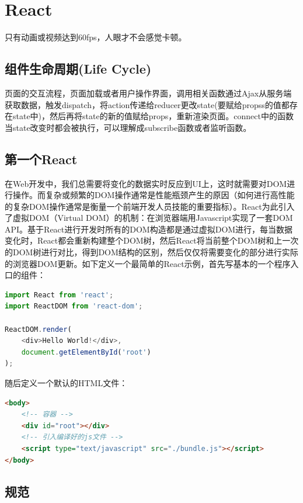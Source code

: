 \documentclass[letter]{book}
\begin{document}
\section{React}

只有动画或视频达到60fps，人眼才不会感觉卡顿。

\subsection{组件生命周期(Life Cycle)}

页面的交互流程，页面加载或者用户操作界面，调用相关函数通过Ajax从服务端获取数据，触发dispatch，将action传递给reducer更改state(要赋给propss的值都存在state中)，然后再将state的新的值赋给props，重新渲染页面。connect中的函数当state改变时都会被执行，可以理解成subscribe函数或者监听函数。

\subsection{第一个React}

在Web开发中，我们总需要将变化的数据实时反应到UI上，这时就需要对DOM进行操作。而复杂或频繁的DOM操作通常是性能瓶颈产生的原因（如何进行高性能的复杂DOM操作通常是衡量一个前端开发人员技能的重要指标）。React为此引入了虚拟DOM（Virtual DOM）的机制：在浏览器端用Javascript实现了一套DOM API。基于React进行开发时所有的DOM构造都是通过虚拟DOM进行，每当数据变化时，React都会重新构建整个DOM树，然后React将当前整个DOM树和上一次的DOM树进行对比，得到DOM结构的区别，然后仅仅将需要变化的部分进行实际的浏览器DOM更新。如下定义一个最简单的React示例，首先写基本的一个程序入口的组件：

\begin{lstlisting}[language=Javascript]
import React from 'react';
import ReactDOM from 'react-dom';

ReactDOM.render(
	<div>Hello World!</div>,
	document.getElementById('root')
);
\end{lstlisting}

随后定义一个默认的HTML文件：

\begin{lstlisting}[language=HTML]
<body>
	<!-- 容器 -->
	<div id="root"></div>
	<!-- 引入编译好的js文件 -->
	<script type="text/javascript" src="./bundle.js"></script>
</body>
\end{lstlisting}

\subsection{规范}
\end{document}
